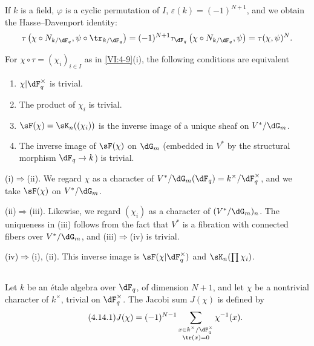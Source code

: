 \documentclass[oneside]{book}
\begin{document}
If $k$ is a field, $\varphi$ is a cyclic permutation of $I$, 
$\varepsilon(k) = (-1)^{N+1}$, and we obtain the Hasse--Davenport identity: 
\[
  \tau\left(\chi\circ N_{k/\dF_q},\psi\circ \tr_{k/\dF_q}\right) = (-1)^{N+1} \tau_{\dF_q}\left(\chi\circ N_{k/\dF_q},\psi\right) = \tau(\chi,\psi)^N \text{.} 
\]





\begin{lemma_}\label{VI:4-13}
For $\chi\circ \tau=(\chi_i)_{i\in I}$ as in \ref{VI:4-9}(i), the
following conditions are equivalent 
\begin{enumerate}[\indent (i)]
  \item $\chi| \dF_q^\times$ is trivial. 
  \item The product of $\chi_i$ is trivial. 
  \item $\sF(\chi) = \sK_n((\chi_i))$ is the inverse image of a unique 
    sheaf on $V^\ast/\dG_m$. 
  \item The inverse image of $\sF(\chi)$ on $\dG_m$ (embedded in 
    $V^\ast$ by the structural morphism $\dF_q \to k$) is trivial. 
\end{enumerate}
\end{lemma_}

(i)$\Rightarrow$(ii). We regard $\chi$ as a character of 
$V^\ast/\dG_m(\dF_q)=k^\times/\dF_q^\times$, and we take $\sF(\chi)$ on 
$V^\ast/\dG_m$. 

(ii)$\Rightarrow$(iii). Likewise, we regard $(\chi_i)$ as a character 
of $(V^\ast/\dG_m)_n$. The uniqueness in (iii) follows from the fact that $V^\ast$ is 
a fibration with connected fibers over $V^\ast/\dG_m$, and (iii)$\Rightarrow$(iv)  
is trivial. 

(iv)$\Rightarrow$(i), (ii). This inverse image is 
$\sF(\chi|\dF_q^\times)$ and $\sK_n(\prod \chi_i)$. 





\subsection{}\label{VI:4-14}

Let $k$ be an étale algebra over $\dF_q$, of 
dimension $N+1$, and let $\chi$ be a nontrivial character of $k^\times$, trivial on 
$\dF_q^\times$. The Jacobi sum $J(\chi)$ is defined by 
\begin{equation*}\tag{4.14.1}\label{VI:eq:4-14-1}
  J(\chi) = (-1)^{N-1} \sum_{\substack{x\in k^\times/\dF_q^\times \\ \tr(x)=0}} \chi^{-1}(x) \text{.} 
\end{equation*}
\end{document}
